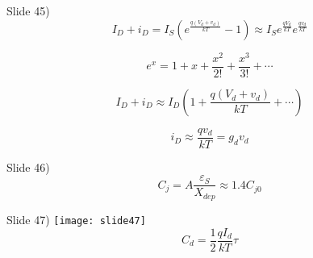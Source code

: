 \documentclass{beamer}
\begin{document}
\begin{frame}{Slide 45)}
\[{I_D} + {i_D} = {I_S}\left( {{e^{\frac{{q({V_d} + {v_d})}}{{kT}}}} - 1} \right) \approx 
{I_S}{e^{\frac{{q{V_d}}}{{kT}}}}{e^{\frac{{q{v_d}}}{{kT}}}}\]

\[{e^x} = 1 + x + \frac{{{x^2}}}{{2!}} + \frac{{{x^3}}}{{3!}} +  \cdots \]

\[{I_D} + {i_D} \approx {I_D}\left( {1 + \frac{{q({V_d} + {v_d})}}{{kT}} +  \cdots } \right)\]

\[{i_D} \approx \frac{{q{v_d}}}{{kT}} = {g_d}{v_d}\]
\end{frame}

\begin{frame}{Slide 46)}
\[{C_j} = A\frac{{{\varepsilon _S}}}{{{X_{dep}}}} \approx 1.4C_{j0}^{}\]
\end{frame}

\begin{frame}{Slide 47)}
\texttt{[image: slide47]}
\[{C_d} = \frac{1}{2}\frac{{q{I_d}}}{{kT}}\tau \]
\end{frame}
\end{document}
